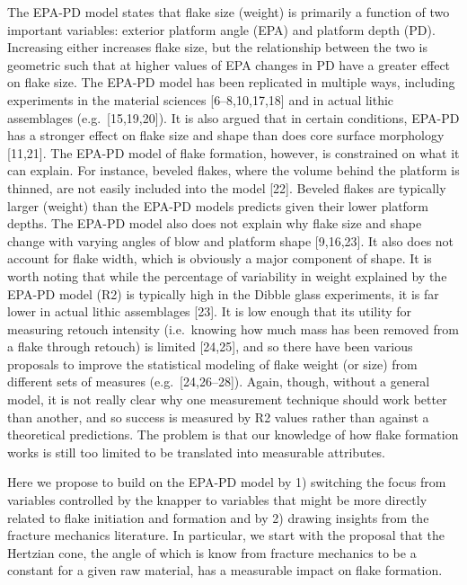 \documentclass[10pt,letterpaper]{article}
\begin{document}
The EPA-PD model states that flake size (weight) is primarily a function
of two important variables: exterior platform angle (EPA) and platform
depth (PD). Increasing either increases flake size, but the relationship
between the two is geometric such that at higher values of EPA changes
in PD have a greater effect on flake size. The EPA-PD model has been
replicated in multiple ways, including experiments in the material
sciences {[}6--8,10,17,18{]} and in actual lithic assemblages
(e.g.~{[}15,19,20{]}). It is also argued that in certain conditions,
EPA-PD has a stronger effect on flake size and shape than does core
surface morphology {[}11,21{]}. The EPA-PD model of flake formation,
however, is constrained on what it can explain. For instance, beveled
flakes, where the volume behind the platform is thinned, are not easily
included into the model {[}22{]}. Beveled flakes are typically larger
(weight) than the EPA-PD models predicts given their lower platform
depths. The EPA-PD model also does not explain why flake size and shape
change with varying angles of blow and platform shape {[}9,16,23{]}. It
also does not account for flake width, which is obviously a major
component of shape. It is worth noting that while the percentage of
variability in weight explained by the EPA-PD model (R2) is typically
high in the Dibble glass experiments, it is far lower in actual lithic
assemblages {[}23{]}. It is low enough that its utility for measuring
retouch intensity (i.e.~knowing how much mass has been removed from a
flake through retouch) is limited {[}24,25{]}, and so there have been
various proposals to improve the statistical modeling of flake weight
(or size) from different sets of measures (e.g.~{[}24,26--28{]}). Again,
though, without a general model, it is not really clear why one
measurement technique should work better than another, and so success is
measured by R2 values rather than against a theoretical predictions. The
problem is that our knowledge of how flake formation works is still too
limited to be translated into measurable attributes.

Here we propose to build on the EPA-PD model by 1) switching the focus
from variables controlled by the knapper to variables that might be more
directly related to flake initiation and formation and by 2) drawing
insights from the fracture mechanics literature. In particular, we start
with the proposal that the Hertzian cone, the angle of which is know
from fracture mechanics to be a constant for a given raw material, has a
measurable impact on flake formation.
\end{document}
